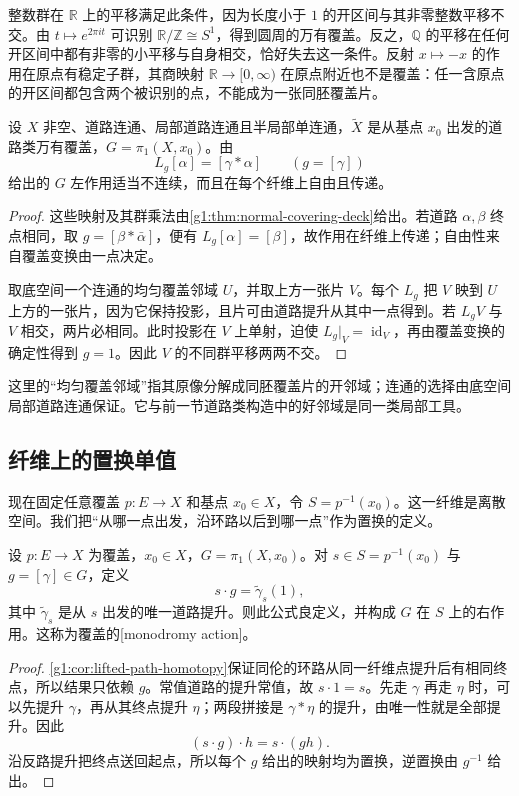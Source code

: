 整数群在 \(\mathbb R\) 上的平移满足此条件，因为长度小于 \(1\) 的开区间与其非零整数平移不交。由 \(t\mapsto e^{2\pi it}\) 可识别 \(\mathbb R/\mathbb Z\cong S^1\)，得到圆周的万有覆盖。反之，\(\mathbb Q\) 的平移在任何开区间中都有非零的小平移与自身相交，恰好失去这一条件。反射 \(x\mapsto-x\) 的作用在原点有稳定子群，其商映射 \(\mathbb R\rightarrow[0,\infty)\) 在原点附近也不是覆盖：任一含原点的开区间都包含两个被识别的点，不能成为一张同胚覆盖片。

\begin{proposition}\label{g1:prop:universal-deck-discontinuous}
	设 \(X\) 非空、道路连通、局部道路连通且半局部单连通，\(\widetilde X\) 是从基点 \(x_0\) 出发的道路类万有覆盖，\(G=\pi_1(X,x_0)\)。由
	\[
		L_g[\alpha]=[\gamma*\alpha]\qquad(g=[\gamma])
	\]
	给出的 \(G\) 左作用适当不连续，而且在每个纤维上自由且传递。
\end{proposition}
\begin{proof}
	这些映射及其群乘法由\cref{g1:thm:normal-covering-deck}给出。若道路 \(\alpha,\beta\) 终点相同，取 \(g=[\beta*\bar\alpha]\)，便有 \(L_g[\alpha]=[\beta]\)，故作用在纤维上传递；自由性来自覆盖变换由一点决定。

	取底空间一个连通的均匀覆盖邻域 \(U\)，并取上方一张片 \(V\)。每个 \(L_g\) 把 \(V\) 映到 \(U\) 上方的一张片，因为它保持投影，且片可由道路提升从其中一点得到。若 \(L_gV\) 与 \(V\) 相交，两片必相同。此时投影在 \(V\) 上单射，迫使 \(L_g|_V=\operatorname{id}_V\)，再由覆盖变换的确定性得到 \(g=1\)。因此 \(V\) 的不同群平移两两不交。
\end{proof}

这里的“均匀覆盖邻域”指其原像分解成同胚覆盖片的开邻域；连通的选择由底空间局部道路连通保证。它与前一节道路类构造中的好邻域是同一类局部工具。

\subsection{纤维上的置换单值}
\label{g1:subsec:0505:02}

现在固定任意覆盖 \(p:E\rightarrow X\) 和基点 \(x_0\in X\)，令 \(S=p^{-1}(x_0)\)。这一纤维是离散空间。我们把“从哪一点出发，沿环路以后到哪一点”作为置换的定义。

\begin{proposition}\label{g1:prop:monodromy-action}
	设 \(p:E\rightarrow X\) 为覆盖，\(x_0\in X\)，\(G=\pi_1(X,x_0)\)。对 \(s\in S=p^{-1}(x_0)\) 与 \(g=[\gamma]\in G\)，定义
	\[
		s\cdot g=\widetilde\gamma_s(1),
	\]
	其中 \(\widetilde\gamma_s\) 是从 \(s\) 出发的唯一道路提升。则此公式良定义，并构成 \(G\) 在 \(S\) 上的右作用。这称为覆盖的[monodromy action]。
\end{proposition}
\begin{proof}
	\cref{g1:cor:lifted-path-homotopy}保证同伦的环路从同一纤维点提升后有相同终点，所以结果只依赖 \(g\)。常值道路的提升常值，故 \(s\cdot1=s\)。先走 \(\gamma\) 再走 \(\eta\) 时，可以先提升 \(\gamma\)，再从其终点提升 \(\eta\)；两段拼接是 \(\gamma*\eta\) 的提升，由唯一性就是全部提升。因此
	\[
		(s\cdot g)\cdot h=s\cdot(gh).
	\]
	沿反路提升把终点送回起点，所以每个 \(g\) 给出的映射均为置换，逆置换由 \(g^{-1}\) 给出。
\end{proof}

